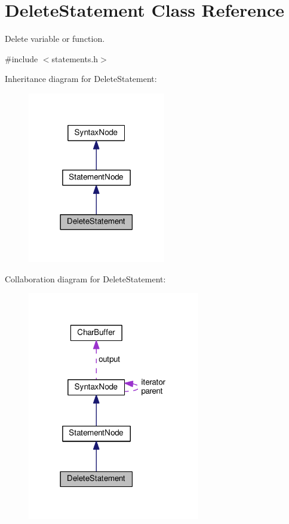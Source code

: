 \hypertarget{classDeleteStatement}{}\section{Delete\+Statement Class Reference}
\label{classDeleteStatement}


Delete variable or function.  




{\ttfamily \#include $<$statements.\+h$>$}



Inheritance diagram for Delete\+Statement\+:
\nopagebreak
\begin{figure}[H]
\begin{center}
\leavevmode
\includegraphics[width=170pt]{d8/d77/classDeleteStatement__inherit__graph}
\end{center}
\end{figure}


Collaboration diagram for Delete\+Statement\+:
\nopagebreak
\begin{figure}[H]
\begin{center}
\leavevmode
\includegraphics[width=213pt]{dd/d96/classDeleteStatement__coll__graph}
\end{center}
\end{figure}
